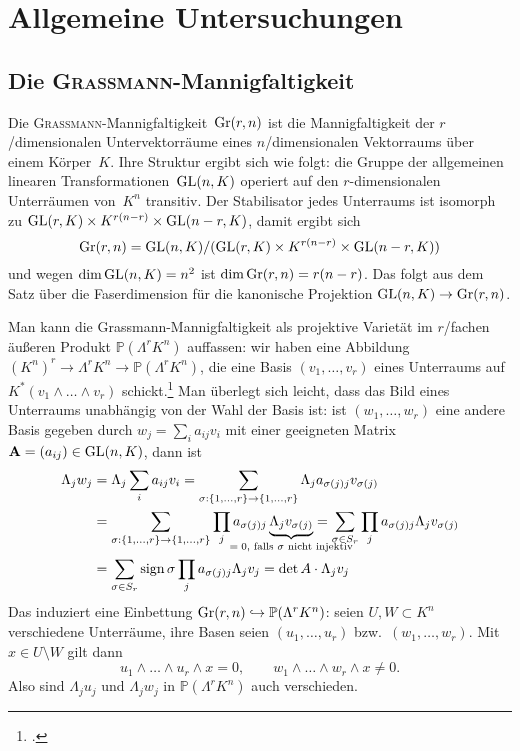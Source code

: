 \chapter{Allgemeine Untersuchungen} \label{chap:general}
\section{Die \textsc{Grassmann}-Mannigfaltigkeit} \label{sec:grassmann}
Die \textsc{Grassmann}-Mannigfaltigkeit~$\grass r/n$ ist die Mannigfaltigkeit der $r$\-/dimensionalen Untervektorräume eines $n$\-/dimensionalen Vektorraums über einem Körper~$K$. Ihre Struktur ergibt sich wie folgt: die Gruppe der allgemeinen linearen Transformationen~$\mathrm{GL}(n,K)$ operiert auf den $r$-dimensionalen Unterräumen von~$K^n$ transitiv. Der Stabilisator jedes Unterraums ist isomorph zu $\mathrm{GL}(r,K) \times K^{r(n-r)} \times \mathrm{GL}(n-r,K)$, damit ergibt sich
\begin{equation}
\grass r/n = \GL nK / (\GL rK \times K^{r(n-r)} \times \GL{n-r}K)
\end{equation}
und wegen $\dim \mathrm{GL}(n,K) = n^2$ ist $\dim \grass r/n = r(n-r)$. Das folgt aus dem Satz über die Faserdimension für die kanonische Projektion $\GL nK \to \grass r/n$.

Man kann die Grassmann-Mannigfaltigkeit als projektive Varietät im $r$\-/fachen äußeren Produkt $\mathbb P(\Lambda^r K^n)$ auffassen: wir haben eine Abbildung $(K^n)^r \to \Lambda^r K^n \to \mathbb P(\Lambda^r K^n)$, die eine Basis $(v_1, \dots, v_r)$ eines Unterraums auf $K^*(v_1 \wedge \dots \wedge v_r)$ schickt.\footcite[siehe hierzu auch][S.~42]{Shafarevich} Man überlegt sich leicht, dass das Bild eines Unterraums unabhängig von der Wahl der Basis ist: ist $(w_1, \dots, w_r)$ eine andere Basis gegeben durch $w_j = \sum_i a_{ij} v_i$ mit einer geeigneten Matrix $\mathbf{A} = (a_{ij}) \in \mathrm{GL}(n,K)$, dann ist
\begin{align*}
\Lambda_j w_j &= \Lambda_j \sum_i a_{ij} v_i = \sum_{\sigma: \{1,\dots,r\} \rightarrow \{1,\dots,r\}} \Lambda_j a_{\sigma(j)j} v_{\sigma(j)} \\
	&= \sum_{\sigma: \{1,\dots,r\} \rightarrow \{1,\dots,r\}} \prod_j a_{\sigma(j)j} \wunderbrace{\Lambda_j v_{\sigma(j)}}_{$= 0$, falls $\sigma$ nicht injektiv} = \sum_{\sigma \in S_r} \prod_j a_{\sigma(j)j} \Lambda_j v_{\sigma(j)} \\
	&= \sum_{\sigma \in S_r} \sign \sigma \prod_j a_{\sigma(j)j} \Lambda_j v_j = \det A \cdot \Lambda_j v_j
\end{align*}
Das induziert eine Einbettung $\grass r/n \into \mathbb P(\Lambda^r K^n)$: seien $U, W \subset K^n$ verschiedene Unterräume, ihre Basen seien $(u_1, \dots, u_r)$ bzw.~$(w_1, \dots, w_r)$. Mit~$x \in U \setminus W$ gilt dann
\begin{equation*}
u_1 \wedge \dots \wedge u_r \wedge x = 0, \qquad w_1 \wedge \dots \wedge w_r \wedge x \neq 0.
\end{equation*}
Also sind $\Lambda_j u_j$ und $\Lambda_j w_j$ in $\mathbb P(\Lambda^r K^n)$ auch verschieden.

